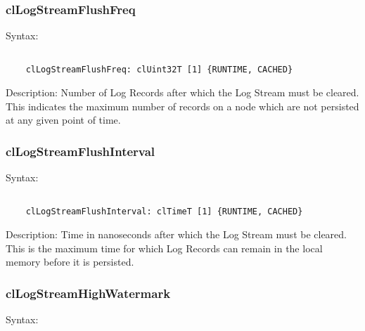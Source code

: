 \begin{flushleft}
\subsubsection{clLogStreamFlushFreq}
\begin{Desc}
\item[Syntax:]
\footnotesize\begin{verbatim}        	

	clLogStreamFlushFreq: clUint32T [1] {RUNTIME, CACHED}
	\end{verbatim}
	\normalsize
\end{Desc}

\begin{Desc}
 \item[Description:]
Number of Log Records after which the Log Stream must be cleared. This indicates the maximum number of records on a node which are not persisted at any 
given point of time.
\end{Desc}



\subsubsection{clLogStreamFlushInterval}
\begin{Desc}
\item[Syntax:]
\footnotesize\begin{verbatim}        	

	clLogStreamFlushInterval: clTimeT [1] {RUNTIME, CACHED}
	\end{verbatim}
	\normalsize
\end{Desc}

\begin{Desc}
 \item[Description:]
Time in nanoseconds after which the Log Stream must be cleared. This is the maximum time for which Log Records can remain in the local memory
before it is persisted.
\end{Desc}



\subsubsection{clLogStreamHighWatermark}
\begin{Desc}
\item[Syntax:]
\footnotesize\begin{verbatim}        	


\end{verbatim}
\end{Desc}
\end{flushleft}
